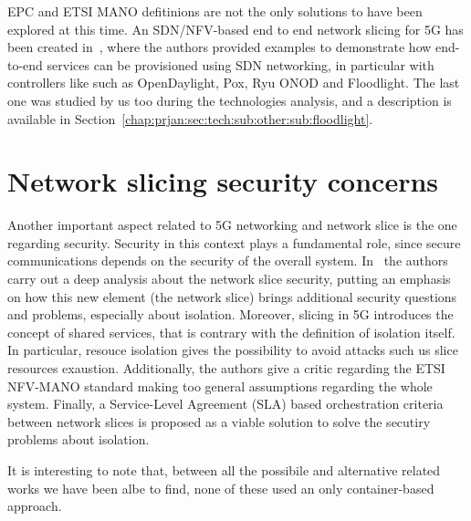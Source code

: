 EPC and ETSI MANO defitinions are not the only solutions to have been explored
at this time. An SDN/NFV-based end to end network slicing for 5G has been
created in~\cite{chartsias2017sdn}, where the authors provided examples to
demonstrate how end-to-end services can be provisioned using SDN networking, in
particular with controllers like such as OpenDaylight, Pox, Ryu ONOD and
Floodlight. The last one was studied by us too during the technologies analysis,
and a description is available in
Section~\ref{chap:prjan:sec:tech:sub:other:sub:floodlight}.

\section{Network slicing security concerns}

Another important aspect related to 5G networking and network slice is the one
regarding security. Security in this context plays a fundamental role, since
secure communications depends on the security of the overall system.
In~\cite{kotulski2017end} the authors carry out a deep analysis about the
network slice security, putting an emphasis on how this new element (the network
slice) brings additional security questions and problems, especially about
isolation. Moreover, slicing in 5G introduces the concept of shared services,
that is contrary with the definition of isolation itself. In particular, resouce
isolation gives the possibility to avoid attacks such us slice resources
exaustion. Additionally, the authors give a critic regarding the ETSI NFV-MANO
standard making too general assumptions regarding the whole system. Finally, a
Service-Level Agreement (SLA) based orchestration criteria between network
slices is proposed as a viable solution to solve the secutiry problems about
isolation.

\vspace{1cm}

\noindent It is interesting to note that, between all the possibile and 
alternative related works we have been albe to find, none of these used an only
container-based approach.
